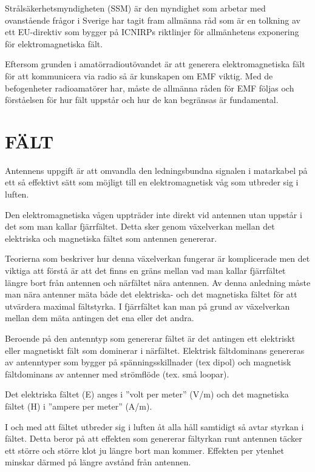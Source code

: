 Strålsäkerhetsmyndigheten (SSM) är den myndighet som arbetar med
ovanstående frågor i Sverige har tagit fram allmänna råd som är
en tolkning av ett EU-direktiv som bygger på ICNIRPs riktlinjer för
allmänhetens exponering för elektromagnetiska fält.

Eftersom grunden i amatörradioutövandet är att generera
elektromagnetiska fält för att kommunicera via radio så är kunskapen
om EMF viktig. Med de befogenheter radioamatörer har, måste de
allmänna råden för EMF följas och förståelsen för hur fält uppstår
och hur de kan begränsas är fundamental.

\section{FÄLT}
Antennens uppgift är att omvandla den ledningsbundna signalen i
matarkabel på ett så effektivt sätt som möjligt till en
elektromagnetisk våg som utbreder sig i luften.

Den elektromagnetiska vågen uppträder inte direkt vid antennen utan
uppstår i det som man kallar fjärrfältet. Detta sker genom växelverkan
mellan det elektriska och magnetiska fältet som antennen genererar.

Teorierna som beskriver hur denna växelverkan fungerar är komplicerade
men det viktiga att förstå är att det finns en gräns mellan vad man
kallar fjärrfältet längre bort från antennen och närfältet nära
antennen. Av denna anledning måste man nära antenner mäta både det
elektriska- och det magnetiska fältet för att utvärdera maximal fältstyrka.
I fjärrfältet kan man på grund av växelverkan mellan dem
mäta antingen det ena eller det andra.

Beroende på den antenntyp som genererar fältet är det antingen ett
elektriskt eller magnetiskt fält som dominerar i närfältet.
Elektrisk fältdominans genereras av antenntyper som bygger på
spänningsskillnader (tex dipol) och magnetisk fältdominans av antenner
med strömflöde (tex. små loopar).

Det elektriska fältet (E) anges i ”volt per meter” (V/m) och det
magnetiska fältet (H) i ”ampere per meter” (A/m).

I och med att fältet utbreder sig i luften åt alla håll samtidigt så
avtar styrkan i fältet. Detta beror på att effekten som genererar
fältyrkan runt antennen täcker ett större och större klot ju
längre bort man kommer. Effekten per ytenhet minskar därmed på
längre avstånd från antennen.

